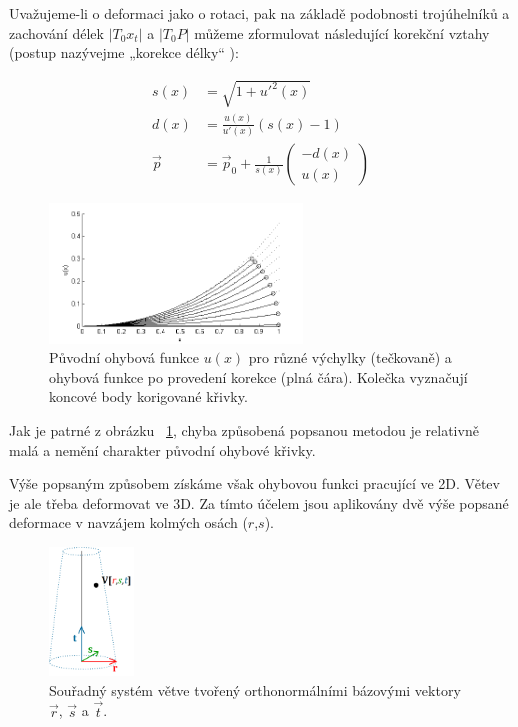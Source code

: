 Uvažujeme-li o deformaci jako o rotaci, pak na základě podobnosti trojúhelníků a zachování délek $|T_0x_t|$ a $|T_0P|$ můžeme zformulovat následující korekční vztahy (postup nazývejme „korekce délky“ ):

\begin{align} 
 \label{lengthCorrection}
s(x) &= \sqrt{1 + u'^{2}(x)}\nonumber\\
d(x) &= \frac{u(x)}{u'(x)}(s(x)-1)\nonumber
\\
\vec{p} &= \vec{p}_0 + \frac{1}{s(x)}\begin{pmatrix}
-d(x)\\u(x) 
\end{pmatrix}
\end{align}

 

\begin{figure}[!hbt]
\begin{center}
\includegraphics[width=0.60\textwidth]{./figures/lengthCorrectionErrorGraph2.png}
\end{center}
\caption[Původní ohybová funkce]%
{Původní ohybová funkce $u(x)$ pro různé výchylky (tečkovaně) a ohybová funkce po provedení korekce (plná čára). Kolečka vyznačují koncové body korigované křivky.
\label{fig:bendCorrectionGraph}
}
\end{figure}


Jak je patrné z obrázku ~\ref{fig:bendCorrectionGraph}, chyba způsobená popsanou metodou je relativně malá a nemění charakter původní ohybové křivky.

Výše popsaným způsobem získáme však ohybovou funkci pracující ve 2D. Větev je ale třeba deformovat ve 3D. Za tímto účelem jsou aplikovány dvě výše popsané deformace v navzájem kolmých osách ($r$,$s$). 

\begin{figure}[!hbt]
\begin{center}
\includegraphics[width=0.2\textwidth]{./figures/branchCoords.png}
\end{center}
\caption[Souřadný systém větve]%
{Souřadný systém větve tvořený orthonormálními bázovými vektory $\vec{r}$, $\vec{s}$ a $\vec{t}$.
\label{fig:branchCoords}
}
\end{figure}

